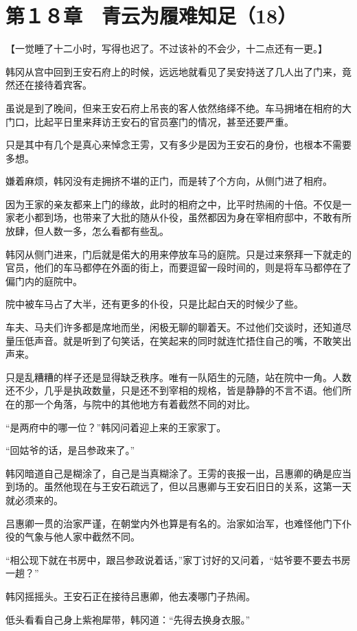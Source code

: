 \section{第１８章　青云为履难知足（18）}

【一觉睡了十二小时，写得也迟了。不过该补的不会少，十二点还有一更。】

韩冈从宫中回到王安石府上的时候，远远地就看见了吴安持送了几人出了门来，竟然还在接待着宾客。

虽说是到了晚间，但来王安石府上吊丧的客人依然络绎不绝。车马拥堵在相府的大门口，比起平日里来拜访王安石的官员塞门的情况，甚至还要严重。

只是其中有几个是真心来悼念王雱，又有多少是因为王安石的身份，也根本不需要多想。

嫌着麻烦，韩冈没有走拥挤不堪的正门，而是转了个方向，从侧门进了相府。

因为王家的亲友都来上门的缘故，此时的相府之中，比平时热闹的十倍。不仅是一家老小都到场，也带来了大批的随从仆役，虽然都因为身在宰相府邸中，不敢有所放肆，但人数一多，怎么看都有些乱。

韩冈从侧门进来，门后就是偌大的用来停放车马的庭院。只是过来祭拜一下就走的官员，他们的车马都停在外面的街上，而要逗留一段时间的，则是将车马都停在了偏门内的庭院中。

院中被车马占了大半，还有更多的仆役，只是比起白天的时候少了些。

车夫、马夫们许多都是席地而坐，闲极无聊的聊着天。不过他们交谈时，还知道尽量压低声音。就是听到了句笑话，在笑起来的同时就连忙捂住自己的嘴，不敢笑出声来。

只是乱糟糟的样子还是显得缺乏秩序。唯有一队陌生的元随，站在院中一角。人数还不少，几乎是执政数量，只是还不到宰相的规格，皆是静静的不言不语。他们所在的那一个角落，与院中的其他地方有着截然不同的对比。

“是两府中的哪一位？”韩冈问着迎上来的王家家丁。

“回姑爷的话，是吕参政来了。”

韩冈暗道自己是糊涂了，自己是当真糊涂了。王雱的丧报一出，吕惠卿的确是应当到场的。虽然他现在与王安石疏远了，但以吕惠卿与王安石旧日的关系，这第一天就必须来的。

吕惠卿一贯的治家严谨，在朝堂内外也算是有名的。治家如治军，也难怪他门下仆役的气象与他人家中截然不同。

“相公现下就在书房中，跟吕参政说着话，”家丁讨好的又问着，“姑爷要不要去书房一趟？”

韩冈摇摇头。王安石正在接待吕惠卿，他去凑哪门子热闹。

低头看看自己身上紫袍犀带，韩冈道：“先得去换身衣服。”

